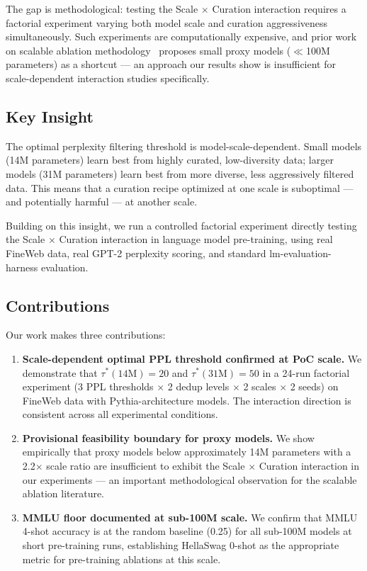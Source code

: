 The gap is methodological: testing the Scale $\times$ Curation interaction requires a factorial experiment varying both model scale and curation aggressiveness simultaneously. Such experiments are computationally expensive, and prior work on scalable ablation methodology~\cite{Na2024Scalable} proposes small proxy models ($\ll$100M parameters) as a shortcut --- an approach our results show is insufficient for scale-dependent interaction studies specifically.

\subsection{Key Insight}

The optimal perplexity filtering threshold is model-scale-dependent. Small models (14M parameters) learn best from highly curated, low-diversity data; larger models (31M parameters) learn best from more diverse, less aggressively filtered data. This means that a curation recipe optimized at one scale is suboptimal --- and potentially harmful --- at another scale.

Building on this insight, we run a controlled factorial experiment directly testing the Scale $\times$ Curation interaction in language model pre-training, using real FineWeb data, real GPT-2 perplexity scoring, and standard lm-evaluation-harness evaluation.

\subsection{Contributions}

Our work makes three contributions:

\begin{enumerate}
\item \textbf{Scale-dependent optimal PPL threshold confirmed at PoC scale.} We demonstrate that $\tau^*(14\text{M}){=}20$ and $\tau^*(31\text{M}){=}50$ in a 24-run factorial experiment (3 PPL thresholds $\times$ 2 dedup levels $\times$ 2 scales $\times$ 2 seeds) on FineWeb data with Pythia-architecture models. The interaction direction is consistent across all experimental conditions.

\item \textbf{Provisional feasibility boundary for proxy models.} We show empirically that proxy models below approximately 14M parameters with a 2.2$\times$ scale ratio are insufficient to exhibit the Scale $\times$ Curation interaction in our experiments --- an important methodological observation for the scalable ablation literature.

\item \textbf{MMLU floor documented at sub-100M scale.} We confirm that MMLU 4-shot accuracy is at the random baseline (0.25) for all sub-100M models at short pre-training runs, establishing HellaSwag 0-shot as the appropriate metric for pre-training ablations at this scale.
\end{enumerate}

